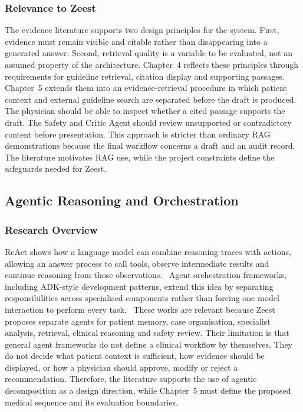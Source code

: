 \subsubsection{Relevance to Zeest}

The evidence literature supports two design principles for the system. First, evidence must remain visible and citable rather than disappearing into a generated answer. Second, retrieval quality is a variable to be evaluated, not an assumed property of the architecture. Chapter~4 reflects these principles through requirements for guideline retrieval, citation display and supporting passages. Chapter~5 extends them into an evidence-retrieval procedure in which patient context and external guideline search are separated before the draft is produced. The physician should be able to inspect whether a cited passage supports the draft. The Safety and Critic Agent should review unsupported or contradictory content before presentation. This approach is stricter than ordinary RAG demonstrations because the final workflow concerns a draft and an audit record. The literature motivates RAG use, while the project constraints define the safeguards needed for Zeest.

\subsection{Agentic Reasoning and Orchestration}
\subsubsection{Research Overview}

ReAct shows how a language model can combine reasoning traces with actions, allowing an answer process to call tools, observe intermediate results and continue reasoning from those observations.~\cite{zeestB:react} Agent orchestration frameworks, including ADK-style development patterns, extend this idea by separating responsibilities across specialised components rather than forcing one model interaction to perform every task.~\cite{zeestB:googleadk} These works are relevant because Zeest proposes separate agents for patient memory, case organisation, specialist analysis, retrieval, clinical reasoning and safety review. Their limitation is that general agent frameworks do not define a clinical workflow by themselves. They do not decide what patient context is sufficient, how evidence should be displayed, or how a physician should approve, modify or reject a recommendation. Therefore, the literature supports the use of agentic decomposition as a design direction, while Chapter~5 must define the proposed medical sequence and its evaluation boundaries.

